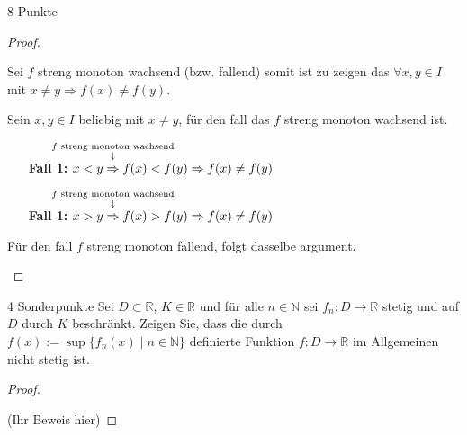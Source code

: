 \documentclass{../problemset}
\begin{document}
\begin{problem}{8 Punkte}
\begin{proof}
\begin{itemize}
		      Sei $f$ streng monoton wachsend (bzw. fallend) somit ist zu zeigen das $\forall x, y \in I$ mit $x \neq y \Rightarrow f(x) \ne f(y)$.

		      Sein $x,y \in I$ beliebig mit $x \ne y$, für den fall das $f$ streng monoton wachsend ist.

		      \begin{itemize}
			      \item [\textbf{Fall 1:}] $x < y \annotated{$f$ streng monoton wachsend}{\Rightarrow} f(x) < f(y) \Rightarrow f(x) \ne f(y)$ \checkmark
			      \item [\textbf{Fall 1:}] $x > y \annotated{$f$ streng monoton wachsend}{\Rightarrow} f(x) > f(y) \Rightarrow f(x) \ne f(y)$ \checkmark
		      \end{itemize}

		      Für den fall $f$ streng monoton fallend, folgt dasselbe argument.
	\end{itemize}
\end{proof}
\end{problem}

\begin{problem}{4 Sonderpunkte}
Sei $D \subset \mathbb{R}$, $K \in \mathbb{R}$ und für alle $n \in \mathbb{N}$ sei $f_n : D \to \mathbb{R}$ stetig und auf $D$ durch $K$ beschränkt. Zeigen Sie, dass die durch $f(x) := \sup\{f_n(x) \mid n \in \mathbb{N}\}$ definierte Funktion $f : D \to \mathbb{R}$ im Allgemeinen nicht stetig ist.
\begin{proof}
	$ $

	(Ihr Beweis hier)
\end{proof}
\end{problem}
\end{document}
